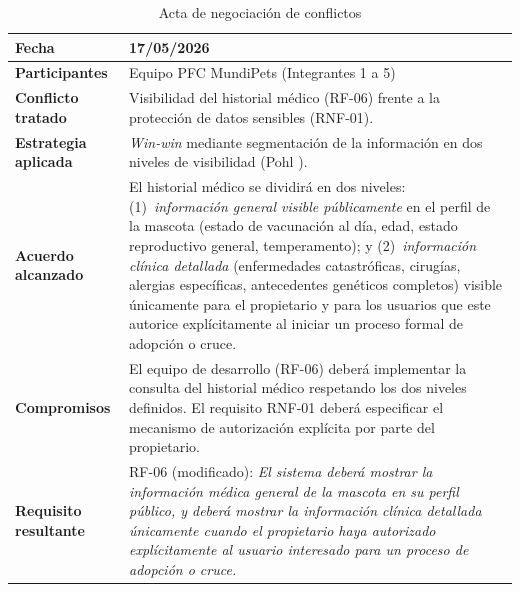 \begin{table}[H]
	\centering
	\caption{Acta de negociación de conflictos}
	\label{tab:acta_negociacion}
	\begin{tabular}{|p{2.8cm}|p{11cm}|}
		\hline
		\textbf{Fecha} & 17/05/2026 \\ \hline
		\textbf{Participantes} & Equipo PFC MundiPets (Integrantes 1 a 5) \\ \hline
		\textbf{Conflicto tratado} & Visibilidad del historial médico (RF-06) frente a la protección de datos sensibles (RNF-01). \\ \hline
		\textbf{Estrategia aplicada} & \textit{Win-win} mediante segmentación de la información en dos niveles de visibilidad (Pohl \cite{pohl2025}). \\ \hline
		\textbf{Acuerdo alcanzado} & El historial médico se dividirá en dos niveles: (1)~\textit{información general visible públicamente} en el perfil de la mascota (estado de vacunación al día, edad, estado reproductivo general, temperamento); y (2)~\textit{información clínica detallada} (enfermedades catastróficas, cirugías, alergias específicas, antecedentes genéticos completos) visible únicamente para el propietario y para los usuarios que este autorice explícitamente al iniciar un proceso formal de adopción o cruce. \\ \hline
		\textbf{Compromisos} & El equipo de desarrollo (RF-06) deberá implementar la consulta del historial médico respetando los dos niveles definidos. El requisito RNF-01 deberá especificar el mecanismo de autorización explícita por parte del propietario. \\ \hline
		\textbf{Requisito resultante} & RF-06 (modificado): \textit{El sistema deberá mostrar la información médica general de la mascota en su perfil público, y deberá mostrar la información clínica detallada únicamente cuando el propietario haya autorizado explícitamente al usuario interesado para un proceso de adopción o cruce.} \\ \hline
	\end{tabular}
\end{table}
